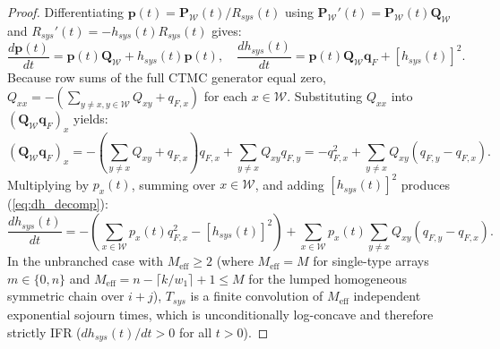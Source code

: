 \documentclass[10pt,a4paper]{article}
\begin{document}
\begin{proof}
Differentiating $\mathbf{p}(t) = \mathbf{P}_{\mathcal{W}}(t)/R_{sys}(t)$ using $\mathbf{P}_{\mathcal{W}}'(t) = \mathbf{P}_{\mathcal{W}}(t)\mathbf{Q}_{\mathcal{W}}$ and $R_{sys}'(t) = -h_{sys}(t)R_{sys}(t)$ gives:
$$\frac{d\mathbf{p}(t)}{dt} = \mathbf{p}(t)\mathbf{Q}_{\mathcal{W}} + h_{sys}(t)\mathbf{p}(t), \quad \frac{d h_{sys}(t)}{dt} = \mathbf{p}(t)\mathbf{Q}_{\mathcal{W}}\mathbf{q}_F + [h_{sys}(t)]^2.$$
Because row sums of the full CTMC generator equal zero, $Q_{xx} = -\left(\sum_{y \neq x, y \in \mathcal{W}} Q_{xy} + q_{F,x}\right)$ for each $x \in \mathcal{W}$. Substituting $Q_{xx}$ into $(\mathbf{Q}_{\mathcal{W}}\mathbf{q}_F)_x$ yields:
$$(\mathbf{Q}_{\mathcal{W}}\mathbf{q}_F)_x = -\left(\sum_{y \neq x} Q_{xy} + q_{F,x}\right)q_{F,x} + \sum_{y \neq x} Q_{xy} q_{F,y} = -q_{F,x}^2 + \sum_{y \neq x} Q_{xy}(q_{F,y} - q_{F,x}).$$
Multiplying by $p_x(t)$, summing over $x \in \mathcal{W}$, and adding $[h_{sys}(t)]^2$ produces (\ref{eq:dh_decomp}):
$$\frac{dh_{sys}(t)}{dt} = -\left(\sum_{x \in \mathcal{W}} p_x(t) q_{F,x}^2 - [h_{sys}(t)]^2\right) + \sum_{x \in \mathcal{W}} p_x(t)\sum_{y \neq x} Q_{xy}(q_{F,y} - q_{F,x}).$$
In the unbranched case with $M_{\mathrm{eff}} \ge 2$ (where $M_{\mathrm{eff}} = M$ for single-type arrays $m \in \{0, n\}$ and $M_{\mathrm{eff}} = n - \lceil k/w_1 \rceil + 1 \le M$ for the lumped homogeneous symmetric chain over $i + j$), $T_{sys}$ is a finite convolution of $M_{\mathrm{eff}}$ independent exponential sojourn times, which is unconditionally log-concave and therefore strictly IFR ($dh_{sys}(t)/dt > 0$ for all $t > 0$).
\end{proof}
\end{document}
